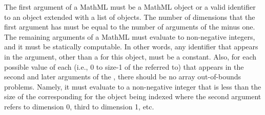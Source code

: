The first argument of a MathML  must be a MathML  object or a valid identifier to an \SBase object extended with a list of \Dimension objects.   The number of dimensions that the first argument has must be equal to the number of arguments of the  minus one. The remaining arguments of a MathML  must evaluate to non-negative integers, and it must be statically computable.   In other words, any identifier that appears in the argument, other than a \Dimension {} for this object, must be a constant.   Also, for each possible value of each \Dimension {}  (i.e., 0 to size-1 of the \Dimension referred to) that appears in the second and later arguments of the ,   there should be no array out-of-bounds problems.   Namely, it must evaluate to a non-negative integer that is less than the size of the corresponding \Dimension for the object being indexed where the second argument refers to dimension 0, third to dimension 1, etc.

